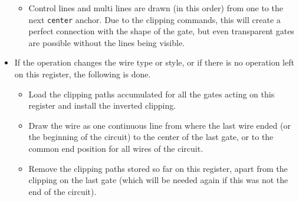 \documentclass{scrartcl}
\begin{document}
\begin{itemize}
\begin{itemize}
                  \item Control lines and multi lines are drawn (in this order) from one to the next \texttt{center} anchor.
                     Due to the clipping commands, this will create a perfect connection with the shape of the gate, but even transparent gates are possible without the lines being visible.
               \end{itemize}
            \item If the operation changes the wire type or style, or if there is no operation left on this register, the following is done.
               \begin{itemize}
                  \item Load the clipping paths accumulated for all the gates acting on this register and install the inverted clipping.
                  \item Draw the wire as one continuous line from where the last wire ended (or the beginning of the circuit) to the center of the last gate, or to the common end position for all wires of the circuit.
                  \item Remove the clipping paths stored so far on this register, apart from the clipping on the last gate (which will be needed again if this was not the end of the circuit).
               \end{itemize}
         \end{itemize}
\end{document}
